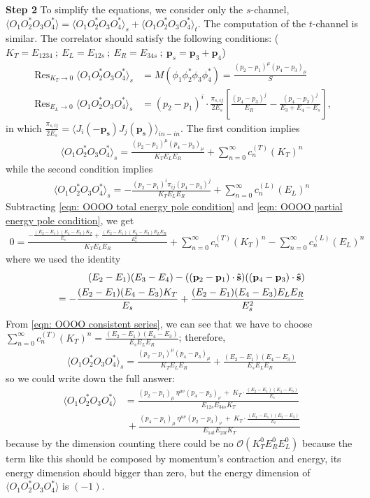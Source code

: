 \documentclass[11pt,a4paper]{article}
\newcommand{\ie}{\begin{equation}\begin{aligned}}
\newcommand{\fe}{\end{aligned}\end{equation}}
\begin{document}
\textbf{Step 2}
To simplify the equations, we consider only the $s$-channel, $\langle O_1O_2^*O_3O_4^* \rangle= \langle O_1O_2^*O_3O_4^* \rangle_s+\langle O_1O_2^*O_3O_4^* \rangle_t$. The computation of the $t$-channel is similar.
The correlator should satisfy the following conditions:
($K_T=E_{1234}\ ;\ E_L =E_{12s}\ ;\ E_R=E_{34s}\ ;\ \boldsymbol{p}_s=\boldsymbol{p}_3+\boldsymbol{p}_4$)
\ie
\mathop{\mathrm{Res}}_{{K_T}\rightarrow 0} \langle O_1O_2^*O_3O_4^* \rangle_s &= 
    M\left( \phi _{1} \phi _{2}^{*} \phi _{3} \phi _{4}^{*}\right) = \frac{(p_{2} -p_{1})^{\mu }(p_{4} -p_{3})_{\mu}}{S}
\\
\mathop{\mathrm{Res}}_{E_{L}\rightarrow 0} \langle O_1O_2^*O_3O_4^* \rangle_s
&= 
    (p_2-p_1)^i  \cdot 
    \frac{\pi_{s,ij}}{2E_s}
    \left[ 
        \frac{(p_4-p_3)^j}{E_{R}}
        - \frac{(p_4-p_3)^j}{E_3+E_4-E_s}
    \right],
\fe
in which $\frac{\pi_{s,ij}}{2E_s}=\langle J_i(\boldsymbol{-p_s}) J_j(\boldsymbol{p_s}) \rangle_{in-in} $. The first condition implies
\ie
\label{eqn: OOOO total energy pole condition}
\langle O_1O_2^*O_3O_4^* \rangle_s = 
    \frac{(p_{2} -p_{1})^{\mu }(p_{4} -p_{3})_{\mu}}{K_T E_L E_R} + \sum_{n=0}^{\infty} c_n^{(T)} (K_T)^n
\fe
while the second condition implies
\ie
\label{eqn: OOOO partial energy pole condition}
\langle O_1O_2^*O_3O_4^* \rangle_s =
    -\frac{(p_2-p_1)^i \pi_{ij} (p_4-p_3)^j}{K_T E_{L} E_{R}} + \sum_{n=0}^{\infty} c_n^{(L)} (E_L)^n
\fe
Subtracting \eqref{eqn: OOOO total energy pole condition} and \eqref{eqn: OOOO partial energy pole condition}, we get
\ie
\label{eqn: OOOO consistent series}
0 = \frac{-\frac{(E_2-E_1)(E_4-E_3)K_T}{E_s} + \frac{(E_2-E_1)(E_4-E_3)E_{L} E_{R}}{E_s^2}}{K_T E_{L} E_{R}} + \sum_{n=0}^{\infty} c_n^{(T)} (K_T)^n -  \sum_{n=0}^{\infty} c_n^{(L)} (E_L)^n
\fe
where we used the identity
\ie
\label{eqn: useful identity for spin 1 exchange}
(E_2-E_1)(E_3-E_4) - ((\bold{p}_2-\bold{p}_1)\cdot \bold{\hat{s}}) ((\bold{p}_4-\bold{p}_3)\cdot \bold{\hat{s}})\\
=
-\frac{(E_2-E_1)(E_4-E_3)K_T}{E_s} + \frac{(E_2-E_1)(E_4-E_3)E_{L} E_{R}}{E_s^2}
\fe
From \eqref{eqn: OOOO consistent series}, we can see that we have to choose $\sum_{n=0}^{\infty} c_n^{(T)} (K_T)^n = \frac{(E_2-E_1)(E_4-E_3)}{E_sE_LE_R}$; therefore,
\ie
\langle O_1O_2^*O_3O_4^* \rangle_s = 
    \frac{(p_{2} -p_{1})^{\mu }(p_{4} -p_{3})_{\mu}}{K_T E_L E_R} + \frac{(E_2-E_1)(E_4-E_3)}{E_sE_LE_R}
\fe
so we could write down the full answer:
\begin{align}
    \langle O_{1} O_{2}^{*} O_{3} O_{4}^{*} \rangle & =\frac{( p_{2} -p_{1})_{\mu } \ \eta ^{\mu \nu }( p_{4} -p_{3})_{\nu } \ +\ K_{T} \cdot \frac{( E_{2} -E_{1})( E_{4} -E_{3})}{E_{s}}}{E_{12s} E_{34s} K_{T}} \nonumber \\
     & \ +\frac{( p_{4} -p_{1})_{\mu } \ \eta ^{\mu \nu }( p_{2} -p_{3})_{\nu } \ +\ K_{T} \cdot \frac{( E_{4} -E_{1})( E_{2} -E_{3})}{E_{t}}}{E_{14t} E_{23t} K_{T}}
\end{align}
because by the dimension counting there could be no $\mathcal{O}(K_T^0E_R^0E_L^0)$ because the term like this should be composed by momentum's contraction and energy, its energy dimension should bigger than zero, but the energy dimension of $\langle O_{1} O_{2}^{*} O_{3} O_{4}^{*} \rangle$ is $(-1)$.
\end{document}
